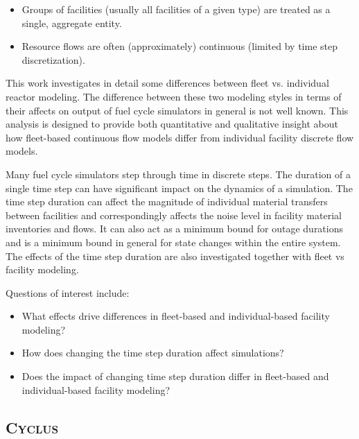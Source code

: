 \documentclass{style}
\newcommand{\Cyclus}{\textsc{Cyclus}\xspace}%
\begin{document}
\begin{itemize}

    \item Groups of facilities (usually all facilities of a given type) are
        treated as a single, aggregate entity.

    \item Resource flows are often (approximately) continuous (limited by time
        step discretization).

\end{itemize}

This work investigates in detail some differences between fleet vs. individual
reactor modeling.  The difference between these two modeling styles in terms
of their affects on output of fuel cycle simulators in general is not well
known. This analysis is designed to provide both quantitative and
qualitative insight about how fleet-based continuous flow models differ from
individual facility discrete flow models.

Many fuel cycle simulators step through time in discrete steps.  The duration
of a single time step can have significant impact on the dynamics of a
simulation.  The time step duration can affect the magnitude of individual
material transfers between facilities and correspondingly affects the noise
level in facility material inventories and flows.  It can also act as a
minimum bound for outage durations and is a minimum bound in general for state
changes within the entire system. The effects of the time step duration are
also investigated together with fleet vs facility modeling.

Questions of interest include:

\begin{itemize}

    \item What effects drive differences in fleet-based and individual-based
        facility modeling?

    \item How does changing the time step duration affect simulations?

    \item Does the impact of changing time step duration differ in fleet-based
        and individual-based facility modeling?

\end{itemize}

\subsection{\Cyclus}
\end{document}
